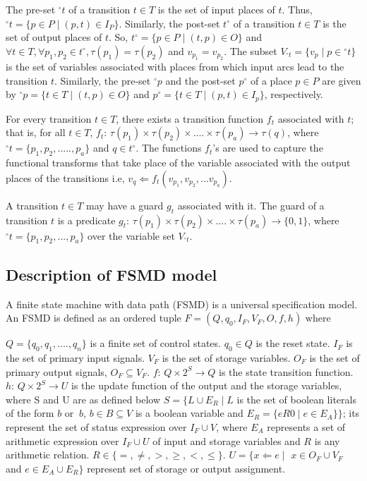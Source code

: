 \documentclass[9pt,executive]{article}
\def\fsmd{FSMD}
\def\fsmdb{(FSMD)}
\def\fsmd{FSMD}
\def\fsmdb{(FSMD)}
\begin{document}
  The pre-set  $^\circ{t}$ of a transition $t \in T$ is the set of input  places of $t$.
Thus, $^\circ{t} = \{p \in P \mid (p,t) \in I_P \}$. Similarly, the post-set  $t^\circ$
of a transition $t \in T$ is the set of output  places of $t$. So, $t^\circ = \{ p
\in P \mid (t,p) \in O \}$ and $ \forall t \in T, \forall p_1, p_2 \in t^\circ,
\tau(p_1) =  \tau(p_2)$ and $ v_{p_1} = v_{p_2}$. The subset $ V_{^\circ{t}} = \{ v_p
\mid p \in {^\circ}{t}\}$ is the set of variables associated with places from which input
arcs lead to the transition $t$. Similarly, the pre-set $^\circ{p}$  and the post-set $p
^\circ$   of a place $p \in P$ are given by $^\circ{p} = \{ t \in T \mid (t, p) \in O
\}$ and $p ^\circ = \{t \in T \mid (p, t) \in I_p\}$, respectively. 

  For every transition $t \in T$, there exists a transition  function $f_t$ associated
with $t$; that is, for all $t \in T$, $f_t$: $\tau(p_1) \times \tau(p_2) \times ....
\times \tau(p_a) \rightarrow \tau (q)$, where $^\circ{t} = \{p_1, p_2,....., p_a\}$ and
$q \in t^\circ$. The functions $f_t$'s are used to capture the functional transforms that take place of the variable associated with the output places of the transitions i.e, $v_q \Leftarrow f_t(v_{p_1}, v_{p_2}, ...v_{p_a})$.

  A transition $t \in T$ may have a guard $g_t$ associated with it. The guard of a
transition $t$ is a predicate $g_t$: $\tau(p_1) \times \tau(p_2) \times .... \times
\tau(p_a)  \rightarrow  \{0, 1\}$, where $^\circ{t} = \{p_1, p_2,..., p_a\}$ over the
variable set $V_{^\circ{t}}$. 
\subsection { Description of {\fsmd} model}
 A finite state machine with data path {\fsmdb} is a universal specification model. An
{\fsmd} is defined as an ordered tuple $F = (Q, q_0, I_F, V_F, O, f, h)$ where 

 $Q = \{q_0, q_1, ...., q_n\} $ is a finite set of control states.
 $ q_0 \in Q $ is the reset state.
 $I_F$ is the set of primary input signals.
 $V_F$ is the set of storage variables.
 $O_F$ is the set of primary output signals, $O_F  \subseteq  V_F$.
 $f$: $Q \times 2^S \rightarrow Q$ is the state transition function.
 $h$: $Q \times 2^S \rightarrow U$ is the update function of the output and the storage variables, where S and U are as defined below
 $S = \{L \cup E_R \mid L$ is the set of boolean literals of the form $b$ or $~b$, $b \in B \subseteq V$ is a boolean variable and $E_R = \{e R 0 \mid  e \in E_A \}\}$; its represent the set of status expression over $I_F \cup V$, where $E_A$ represents a set of arithmetic expression over $I_F \cup U$ of input and storage variables and $R$ is any arithmetic relation. $R \in \{=, \neq, >, \geq, <, \leq \}$.
 $U = \{x \Leftarrow e \mid$ $ x \in O_F \cup V_F$ and $e \in E_A \cup E_R \}$ represent set of storage or output assignment. 
  
\end{document}
